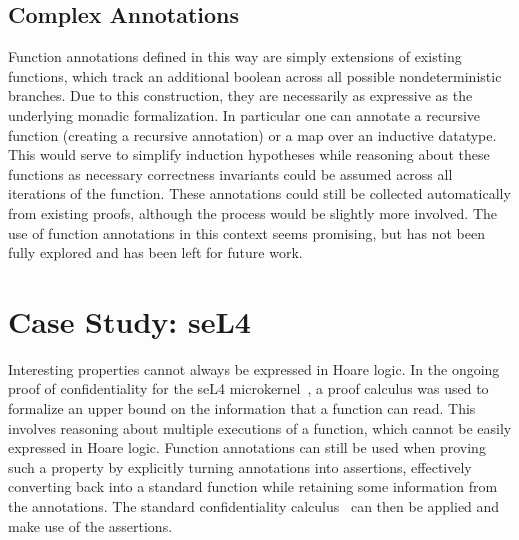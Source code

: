 \documentclass[submission]{eptcs}
\begin{document}
\begin{isabellebody}
\begin{isamarkuptext}
\subsection*{Complex Annotations}
Function annotations defined in this way are simply extensions
of existing functions, which track an additional boolean across all
possible nondeterministic branches. Due to this construction, they
are necessarily as expressive as the underlying monadic formalization. In particular
one can annotate a recursive function (creating a recursive annotation) or a map over
an inductive datatype. This would serve to simplify induction hypotheses while reasoning
about these functions as necessary correctness invariants could be assumed across all
iterations of the function. These annotations could still be collected automatically
from existing proofs, although the process would be slightly more involved. The use
of function annotations in this context seems promising, but has not been fully explored
and has been left for future work.

\section{Case Study: seL4}

Interesting properties cannot always be expressed in Hoare logic.
In the ongoing proof of confidentiality for the seL4 
microkernel~\cite{Murray_MBGK_12},
a proof calculus was used to formalize an upper bound on the
information that a function can read. This involves reasoning
about multiple executions of a function, which cannot be
easily expressed in Hoare logic. Function annotations can
still be used when proving such a property by explicitly turning
annotations into assertions, effectively converting back
into a standard function while retaining some information
from the annotations. The standard confidentiality 
calculus~\cite{Murray_MBGK_12} can then be applied and make use of the assertions.


\end{isamarkuptext}
\end{isabellebody}
\end{document}
